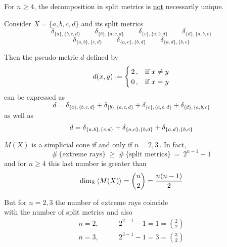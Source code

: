 \documentclass[./main.tex]{subfiles}
\begin{document}
\begin{remark}
    For $n \geq 4$, the decomposition in split metrics is \underline{not} necessarily unique. \bigskip

    Consider $X = \{a,b,c,d\}$ and its split metrics
    \[ \delta_{\{a\},\{b,c,d\}} \qquad \delta_{\{b\},\{a,c,d\}} \qquad \delta_{\{c\},\{a,b,d\}} \qquad \delta_{\{d\},\{a,b,c\}} \]
    \[ \delta_{\{a,b\},\{c,d\}} \qquad \delta_{\{a,c\},\{b,d\}} \qquad \delta_{\{a,d\},\{b,c\}} \]

    Then the pseudo-metric $d$ defined by
    \[ d(x,y) \defeq
        \begin{cases}
        \, 2 \,,    & \text{if}\ x \neq y \\
        \, 0 \,,    & \text{if}\ x = y
        \end{cases} \nospblw \]
    can be expressed as
    \[ d = \delta_{\{a\},\{b,c,d\}} + \delta_{\{b\},\{a,c,d\}} + \delta_{\{c\},\{a,b,d\}} + \delta_{\{d\},\{a,b,c\}} \]
    as well as
    \[ d = \delta_{\{a,b\},\{c,d\}} + \delta_{\{a,c\},\{b,d\}} + \delta_{\{a,d\},\{b,c\}} \nospabv \nospblw \]
\end{remark}

\begin{remark}
    $M(X)$ is a simplicial cone if and only if $n = 2,3 \,$. In fact,
    \[ \#\,\{\text{extreme rays}\} \ \geq\ \#\,\{\text{split metrics}\} \ =\ 2^{n-1} - 1 \]
    and for $n \geq 4$ this last number is greater than
    \[ \dim_{\mathbb{R}} \left\langle M(X)\right\rangle = \binom{n}{2} = \frac{n(n-1)}{2} \]

    But for $n = 2,3$ the number of extreme rays coincide \\
    with the number of split metrics and also
    \begin{align*}
        n = 2, &\qquad 2^{2-1} - 1 = 1 = \binom{2}{2} \\[5pt]
        n = 3, &\qquad 2^{3-1} - 1 = 3 = \binom{3}{2}
    \end{align*}
\end{remark}
\end{document}
